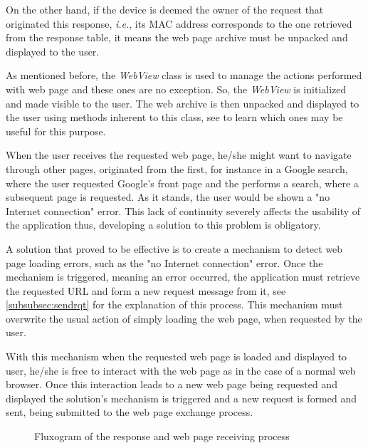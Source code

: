 On the other hand, if the device is deemed the owner of the request that originated this response, \textit{i.e.}, its \gls{MAC} address corresponds to the one retrieved from the response table, it means the web page archive must be unpacked and displayed to the user.

As mentioned before, the \textit{WebView} class is used to manage the actions performed with web page and these ones are no exception. So, the \textit{WebView} is initialized and made visible to the user. The web archive is then unpacked and displayed to the user using methods inherent to this class, see \cite{webview} to learn which ones may be useful for this purpose.

When the user receives the requested web page, he/she might want to navigate through other pages, originated from the first, for instance in a Google search, where the user requested Google's front page and the performs a search, where a subsequent page is requested. As it stands, the user would be shown a "no Internet connection" error. This lack of continuity severely affects the usability of the application thus, developing a solution to this problem is obligatory.

A solution that proved to be effective is to create a mechanism to detect web page loading errors, such as the "no Internet connection" error. Once the mechanism is triggered, meaning an error occurred, the application must retrieve the requested \gls{URL} and form a new request message from it, see \ref{subsubsec:sendrqt} for the explanation of this process. This mechanism must overwrite the usual action of simply loading the web page, when requested by the user.

With this mechanism when the requested web page is loaded and displayed to user, he/she is free to interact with the web page as in the case of a normal web browser. Once this interaction leads to a new web page being requested and displayed the solution's mechanism is triggered and a new request is formed and sent, being submitted to the web page exchange process.

\begin{figure}[ht]
   \noindent{}
	\caption{\label{fig:rsprcvflux} Fluxogram of the response and web page receiving process}
\end{figure}

